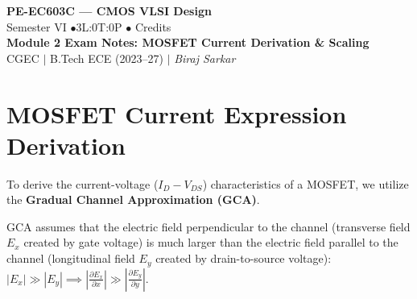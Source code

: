 \documentclass[12pt,a4paper]{article}
\begin{document}

\begin{center}
  {\LARGE\bfseries\color{myred} PE-EC603C --- CMOS VLSI Design}\\[5pt]
  {\normalsize\color{mydark} Semester VI \quad$\bullet$\quad 3L:0T:0P \quad$\bullet$ Credits}\\[3pt]
  {\normalsize\color{myteal}\textbf{Module 2 Exam Notes: MOSFET Current Derivation \& Scaling}}\\[3pt]
  {\small\color{mydark} CGEC \;$|$\; B.Tech ECE (2023--27) \;$|$\; \textit{Biraj Sarkar}}
\end{center}
\vspace{2pt}
\noindent{\color{myred}\rule{\linewidth}{1.5pt}}
\vspace{2pt}

\hypersetup{linkcolor=mydark}
\tableofcontents
\hypersetup{linkcolor=myteal}
\newpage

\section{MOSFET Current Expression Derivation}

To derive the current-voltage ($I_D-V_{DS}$) characteristics of a MOSFET, we utilize the \textbf{Gradual Channel Approximation (GCA)}.

\begin{tcolorbox}[defbox, title={\textbf{Gradual Channel Approximation (GCA)}}]
GCA assumes that the electric field perpendicular to the channel (transverse field $E_x$ created by gate voltage) is much larger than the electric field parallel to the channel (longitudinal field $E_y$ created by drain-to-source voltage): $|E_x| \gg |E_y| \implies \left|\frac{\partial E_x}{\partial x}\right| \gg \left|\frac{\partial E_y}{\partial y}\right|$.
\end{tcolorbox}
\end{document}

